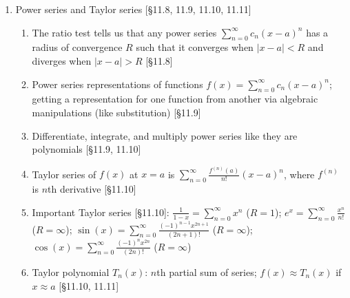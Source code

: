 \documentclass[11pt]{article}
\begin{document}
\begin{enumerate}
\item Power series and Taylor series [\S11.8, 11.9, 11.10, 11.11]
\begin{enumerate}
\item The ratio test tells us that any power series $\sum_{n=0}^{\infty} c_n (x-a)^n$ has a radius of convergence $R$ such that it converges when $|x-a|<R$ and diverges when $|x-a|>R$ [\S11.8]
\item Power series representations of functions $f(x) = \sum_{n=0}^{\infty} c_n (x-a)^n$; getting a representation for one function from another via algebraic manipulations (like substitution) [\S11.9]
\item Differentiate, integrate, and multiply power series like they are polynomials [\S11.9, 11.10]
\item Taylor series of $f(x)$ at $x=a$ is $\sum_{n=0}^{\infty} \frac{f^{(n)}(a)}{n!} (x-a)^n$, where $f^{(n)}$ is $n$th derivative [\S11.10]
\item Important Taylor series [\S11.10]: $\frac{1}{1-x} = \sum_{n=0}^{\infty} x^n$ ($R=1$); \; $e^x = \sum_{n=0}^{\infty} \frac{x^n}{n!}$ ($R=\infty$); \; $\sin(x) = \sum_{n=0}^{\infty} \frac{(-1)^{n-1}x^{2n+1}}{(2n+1)!}$ ($R=\infty$); \; $\cos(x)=\sum_{n=0}^{\infty}\frac{(-1)^{n}x^{2n}}{(2n)!}$ ($R=\infty$)
\item Taylor polynomial $T_n(x)$: $n$th partial sum of series; $f(x) \approx T_n(x)$ if $x\approx a$ [\S11.10, 11.11]
\end{enumerate}
\end{enumerate}
\end{document}
